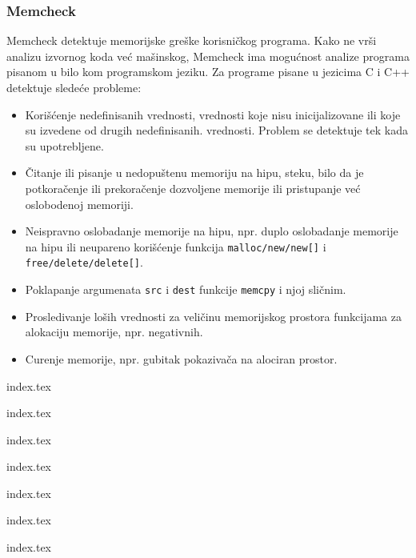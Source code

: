 \subsubsection{Memcheck}\label{memcheck}

Memcheck detektuje memorijske greške korisničkog programa. Kako ne vrši analizu izvornog koda već mašinskog, Memcheck ima mogućnost analize programa pisanom u bilo kom programskom jeziku. Za programe pisane u jezicima C i C++ detektuje sledeće probleme:

\begin{itemize}
\tightlist
\item
  Korišćenje nedefinisanih vrednosti, vrednosti koje nisu inicijalizovane ili koje su izvedene od drugih nedefinisanih. vrednosti. Problem se detektuje tek kada su upotrebljene.
\item
  Čitanje ili pisanje u nedopuštenu memoriju na hipu, steku, bilo da je potkoračenje ili prekoračenje dozvoljene memorije ili pristupanje već oslobodenoj memoriji.
\item
  Neispravno oslobadanje memorije na hipu, npr. duplo oslobadanje memorije na hipu ili neupareno korišćenje funkcija \texttt{malloc/new/new{[}{]}} i \texttt{free/delete/delete{[}{]}}.
\item
  Poklapanje argumenata \texttt{src} i \texttt{dest} funkcije \texttt{memcpy} i njoj sličnim.
\item
  Prosledivanje loših vrednosti za veličinu memorijskog prostora funkcijama za alokaciju memorije, npr. negativnih.
\item
  Curenje memorije, npr. gubitak pokazivača na alociran prostor.
\end{itemize}

{index.tex}

{index.tex}

{index.tex}

{index.tex}

{index.tex}

{index.tex}

{index.tex}
